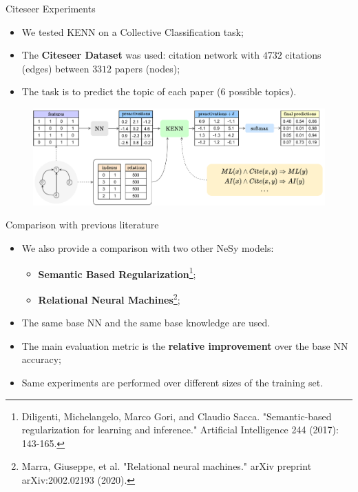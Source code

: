 \documentclass{beamer}
\begin{document}
\begin{frame}{Citeseer Experiments}
	\begin{itemize}
		\item We tested KENN on a Collective Classification task;
		\item The \textbf{Citeseer Dataset} was used: citation network with $4732$ citations (edges) between $3312$ papers (nodes);
		\item The task is to predict the topic of each paper (6 possible topics).
	\end{itemize}

\begin{figure}
	\includegraphics[width=\linewidth]{images/citeseer_setup_pres.pdf}
\end{figure}
\end{frame}

\begin{frame}{Comparison with previous literature}
	\begin{itemize}
		\item We also provide a comparison with two other NeSy models:
		\begin{itemize}
			\item \textbf{Semantic Based Regularization}\footnote{Diligenti, Michelangelo, Marco Gori, and Claudio Sacca. "Semantic-based regularization for learning and inference." Artificial Intelligence 244 (2017): 143-165.};
			\item \textbf{Relational Neural Machines}\footnote{Marra, Giuseppe, et al. "Relational neural machines." arXiv preprint arXiv:2002.02193 (2020). \vspace{18pt}};
		\end{itemize}
	\pause
	
		\item The same base NN and the same base knowledge are used.
		\pause

		\item The main evaluation metric is the \textbf{relative improvement} over the base NN accuracy;
		\pause

		\item Same experiments are performed over different sizes of the training set.
	\end{itemize}
	
	
\end{frame}
\end{document}
